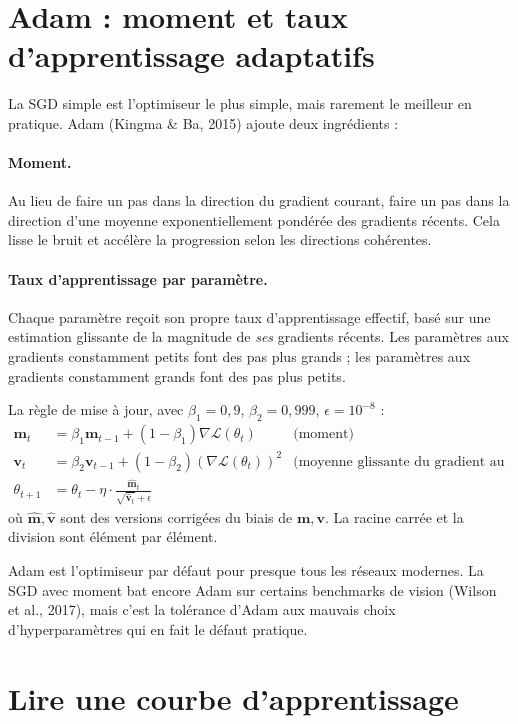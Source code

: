 \section{Adam : moment et taux d'apprentissage adaptatifs}

La SGD simple est l'optimiseur le plus simple, mais rarement le meilleur en pratique. Adam (Kingma \& Ba, 2015) ajoute deux ingrédients :

\paragraph{Moment.} Au lieu de faire un pas dans la direction du gradient courant, faire un pas dans la direction d'une moyenne exponentiellement pondérée des gradients récents. Cela lisse le bruit et accélère la progression selon les directions cohérentes.

\paragraph{Taux d'apprentissage par paramètre.} Chaque paramètre reçoit son propre taux d'apprentissage effectif, basé sur une estimation glissante de la magnitude de \emph{ses} gradients récents. Les paramètres aux gradients constamment petits font des pas plus grands ; les paramètres aux gradients constamment grands font des pas plus petits.

La règle de mise à jour, avec $\beta_1 = 0,9$, $\beta_2 = 0,999$, $\epsilon = 10^{-8}$ :
\begin{align*}
\bm{m}_t &= \beta_1 \bm{m}_{t-1} + (1 - \beta_1) \nabla \mathcal{L}(\theta_t) &\text{(moment)} \\
\bm{v}_t &= \beta_2 \bm{v}_{t-1} + (1 - \beta_2) (\nabla \mathcal{L}(\theta_t))^2 &\text{(moyenne glissante du gradient au carré)} \\
\theta_{t+1} &= \theta_t - \eta \cdot \frac{\hat{\bm{m}}_t}{\sqrt{\hat{\bm{v}}_t} + \epsilon}
\end{align*}
où $\hat{\bm{m}}, \hat{\bm{v}}$ sont des versions corrigées du biais de $\bm{m}, \bm{v}$. La racine carrée et la division sont élément par élément.

Adam est l'optimiseur par défaut pour presque tous les réseaux modernes. La SGD avec moment bat encore Adam sur certains benchmarks de vision (Wilson et al., 2017), mais c'est la tolérance d'Adam aux mauvais choix d'hyperparamètres qui en fait le défaut pratique.

\section{Lire une courbe d'apprentissage}

